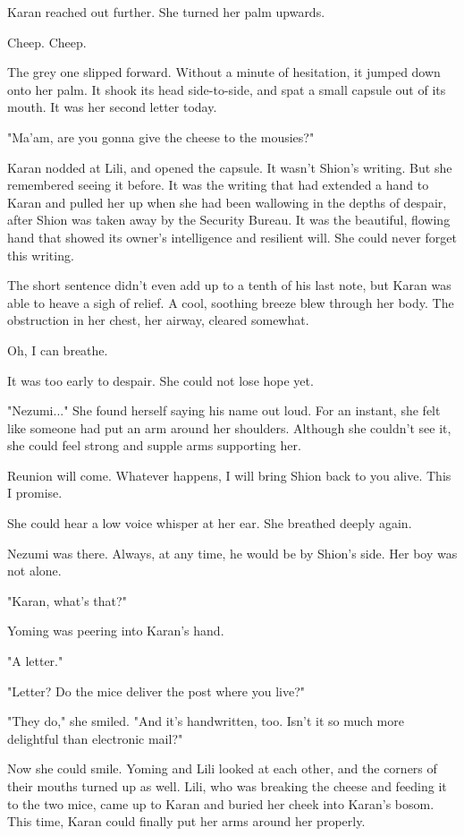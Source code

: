 Karan reached out further. She turned her palm upwards.

Cheep. Cheep.

The grey one slipped forward. Without a minute of hesitation, it jumped
down onto her palm. It shook its head side-to-side, and spat a small
capsule out of its mouth. It was her second letter today.

"Ma'am, are you gonna give the cheese to the mousies?"

Karan nodded at Lili, and opened the capsule. It wasn't Shion's writing.
But she remembered seeing it before. It was the writing that had
extended a hand to Karan and pulled her up when she had been wallowing
in the depths of despair, after Shion was taken away by the Security
Bureau. It was the beautiful, flowing hand that showed its owner's
intelligence and resilient will. She could never forget this writing.

The short sentence didn't even add up to a tenth of his last note, but
Karan was able to heave a sigh of relief. A cool, soothing breeze blew
through her body. The obstruction in her chest, her airway, cleared
somewhat.

Oh, I can breathe.

It was too early to despair. She could not lose hope yet.

"Nezumi..." She found herself saying his name out loud. For an instant,
she felt like someone had put an arm around her shoulders. Although she
couldn't see it, she could feel strong and supple arms supporting her.

Reunion will come. Whatever happens, I will bring Shion back to you
alive. This I promise.

She could hear a low voice whisper at her ear. She breathed deeply
again.

Nezumi was there. Always, at any time, he would be by Shion's side. Her
boy was not alone.

"Karan, what's that?"

Yoming was peering into Karan's hand.

"A letter."

"Letter? Do the mice deliver the post where you live?"

"They do," she smiled. "And it's handwritten, too. Isn't it so much more
delightful than electronic mail?"

Now she could smile. Yoming and Lili looked at each other, and the
corners of their mouths turned up as well. Lili, who was breaking the
cheese and feeding it to the two mice, came up to Karan and buried her
cheek into Karan's bosom. This time, Karan could finally put her arms
around her properly.

